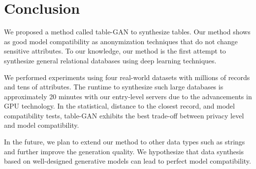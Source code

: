 \documentclass{vldb}
\begin{document}
\section{Conclusion}

We proposed a method called table-GAN to synthesize tables. Our method shows as good model compatibility as anonymization techniques that do not change sensitive attributes. To our knowledge, our method is the first attempt to synthesize general relational databases using deep learning techniques.

We performed experiments using four real-world datasets with millions of records and tens of attributes. The runtime to synthesize such large databases is approximately 20 minutes with our entry-level servers due to the advancements in GPU technology. In the statistical, distance to the closest record, and model compatibility tests, table-GAN exhibits the best trade-off between privacy level and model compatibility.

In the future, we plan to extend our method to other data types such as strings and further improve the generation quality. We hypothesize that data synthesis based on well-designed generative models can lead to perfect model compatibility.

\clearpage

\end{document}

